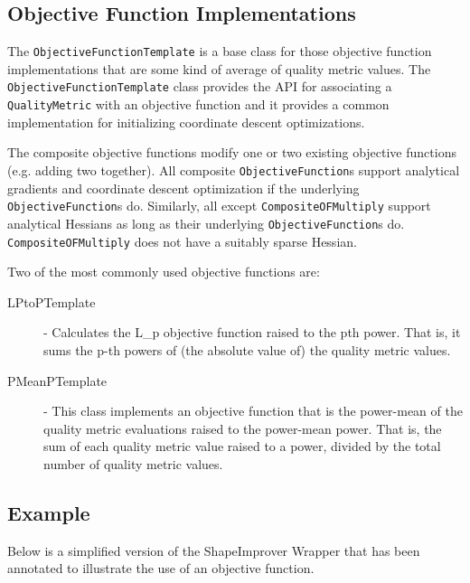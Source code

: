\subsection{Objective Function Implementations}
\label{sec:objfunc_impl}

The \texttt{ObjectiveFunctionTemplate} is a base class for those objective function implementations that are some kind of average of quality metric values.  The \texttt{ObjectiveFunctionTemplate} class provides the API for associating a \texttt{QualityMetric} with an objective function and it provides a common implementation for initializing coordinate descent optimizations.

The composite objective functions modify one or two existing objective functions (e.g. adding two together).  All composite \texttt{ObjectiveFunction}s support analytical gradients and coordinate descent optimization if the underlying \texttt{ObjectiveFunction}s do.  Similarly, all except \texttt{CompositeOFMultiply} support analytical Hessians as long as their underlying \texttt{ObjectiveFunction}s do.  \texttt{CompositeOFMultiply} does not have a suitably sparse Hessian.

Two of the most commonly used objective functions are:

\begin{description}
\item[LPtoPTemplate] - Calculates the L\_p objective function raised to the pth power.
    That is, it sums the p-th powers of (the absolute value of) the quality metric values.

\item[PMeanPTemplate] - This class implements an objective function that is the power-mean
    of the quality metric evaluations raised to the power-mean power.  That is, the sum of 
   each quality metric value raised to a power, divided by the total number of quality 
   metric values.
\end{description}

\subsection{Example}

Below is a simplified version of the ShapeImprover Wrapper that has been annotated to illustrate the use of an objective function.


